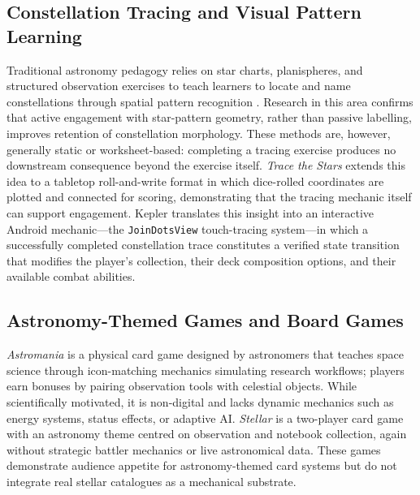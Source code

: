 \documentclass[conference]{IEEEtran}
\begin{document}
\subsection{Constellation Tracing and Visual Pattern Learning}
Traditional astronomy pedagogy relies on star charts, planispheres, and structured observation exercises to teach learners to locate and name constellations through spatial pattern recognition \cite{lcd_constellations}. Research in this area confirms that active engagement with star-pattern geometry, rather than passive labelling, improves retention of constellation morphology. These methods are, however, generally static or worksheet-based: completing a tracing exercise produces no downstream consequence beyond the exercise itself. \textit{Trace the Stars} \cite{tracestars} extends this idea to a tabletop roll-and-write format in which dice-rolled coordinates are plotted and connected for scoring, demonstrating that the tracing mechanic itself can support engagement. Kepler translates this insight into an interactive Android mechanic---the \texttt{JoinDotsView} touch-tracing system---in which a successfully completed constellation trace constitutes a verified state transition that modifies the player's collection, their deck composition options, and their available combat abilities.

\subsection{Astronomy-Themed Games and Board Games}
\textit{Astromania} \cite{astromania} is a physical card game designed by astronomers that teaches space science through icon-matching mechanics simulating research workflows; players earn bonuses by pairing observation tools with celestial objects. While scientifically motivated, it is non-digital and lacks dynamic mechanics such as energy systems, status effects, or adaptive AI. \textit{Stellar} \cite{stellar_card} is a two-player card game with an astronomy theme centred on observation and notebook collection, again without strategic battler mechanics or live astronomical data. These games demonstrate audience appetite for astronomy-themed card systems but do not integrate real stellar catalogues as a mechanical substrate.
\end{document}
